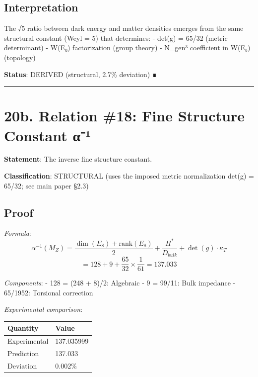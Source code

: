 \documentclass[11pt,a4paper]{article}
\begin{document}
\subsection{Interpretation}\label{interpretation}

The √5 ratio between dark energy and matter densities emerges from the same structural constant (Weyl = 5) that determines: - det(g) = 65/32 (metric determinant) - \textbar W(E₈)\textbar{} factorization (group theory) - N\_\allowbreak{}gen³ coefficient in \textbar W(E₈)\textbar{} (topology)

\textbf{Status}: DERIVED (structural, 2.7\% deviation) ∎

\begin{center}\rule{\linewidth}{0.5pt}\end{center}

\section{20b. Relation \#18: Fine Structure Constant α⁻¹}\label{b.-relation-18-fine-structure-constant-ux3b1uxb9}

\textbf{Statement}: The inverse fine structure constant.

\textbf{Classification}: STRUCTURAL (uses the imposed metric normalization det(g) = 65/32; see main paper §2.3)

\subsection{Proof}\label{proof-28}

\emph{Formula}: \[\alpha^{-1}(M_Z) = \frac{\dim(E_8) + \text{rank}(E_8)}{2} + \frac{H^*}{D_{bulk}} + \det(g) \cdot \kappa_T\] \[= 128 + 9 + \frac{65}{32} \times \frac{1}{61} = 137.033\]

\emph{Components}: - 128 = (248 + 8)/2: Algebraic - 9 = 99/11: Bulk impedance - 65/1952: Torsional correction

\emph{Experimental comparison}:

\begin{longtable}[]{@{}ll@{}}
\toprule\noalign{}
Quantity & Value \\
\midrule\noalign{}
\endhead
\bottomrule\noalign{}
\endlastfoot
Experimental & 137.035999 \\
Prediction & 137.033 \\
Deviation & 0.002\% \\
\end{longtable}
\end{document}
